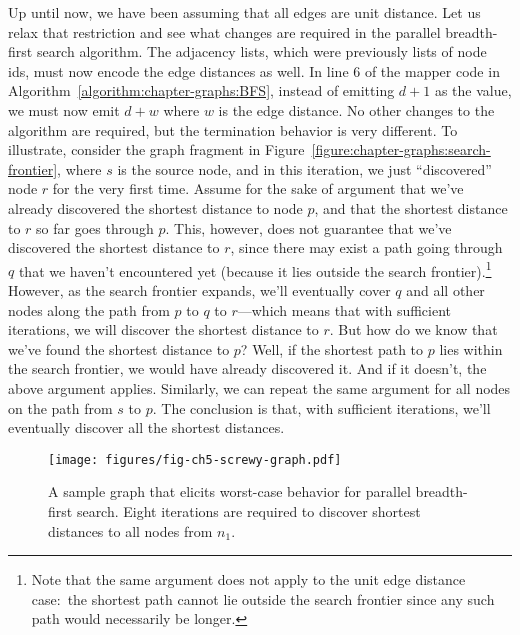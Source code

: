 Up until now, we have been assuming that all edges are unit distance.
Let us relax that restriction and see what changes are required in the
parallel breadth-first search algorithm.  The adjacency lists, which
were previously lists of node ids, must now encode the edge distances
as well.  In line 6 of the mapper code in
Algorithm~\ref{algorithm:chapter-graphs:BFS}, instead of emitting $d+1$ as
the value, we must now emit $d+w$ where $w$ is the edge distance.  No
other changes to the algorithm are required, but the termination
behavior is very different.  To illustrate, consider the graph
fragment in Figure~\ref{figure:chapter-graphs:search-frontier}, where
$s$ is the source node, and in this iteration, we just ``discovered''
node $r$ for the very first time.  Assume for the sake of argument
that we've already discovered the shortest distance to node $p$, and
that the shortest distance to $r$ so far goes through $p$.  This,
however, does not guarantee that we've discovered the shortest
distance to $r$, since there may exist a path going through $q$ that
we haven't encountered yet (because it lies outside the search
frontier).\footnote{Note that the same argument does not apply to the
  unit edge distance case:\ the shortest path cannot lie outside the
  search frontier since any such path would necessarily be longer.}
However, as the search frontier expands, we'll eventually cover $q$
and all other nodes along the path from $p$ to $q$ to $r$---which
means that with sufficient iterations, we will discover the shortest
distance to $r$.  But how do we know that we've found the shortest
distance to $p$?  Well, if the shortest path to $p$ lies within the
search frontier, we would have already discovered it.  And if it
doesn't, the above argument applies.  Similarly, we can repeat the
same argument for all nodes on the path from $s$ to $p$.  The
conclusion is that, with sufficient iterations, we'll eventually
discover all the shortest distances.

\begin{figure}[t]
\begin{center}
\texttt{[image: figures/fig-ch5-screwy-graph.pdf]}
\end{center}
\caption{A sample graph that elicits worst-case behavior for parallel
  breadth-first search.  Eight iterations are required to discover
  shortest distances to all nodes from $n_1$.}
\label{figure:chapter-graphs:screwy-graph}
\end{figure}

